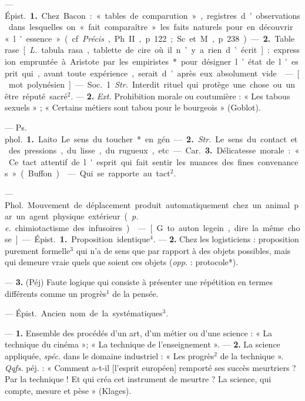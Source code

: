 
	\begin{itemize}[leftmargin=1cm, label=, itemsep=1pt]

 — \si{Épist.} {\bf 1.} Chez Bacon : « tables
de comparution », registres d’observations dans lesquelles on « fait
comparaître » les faits naturels pour
en découvrir « l'essence » (cf. {\it Précis},
Ph. II, p. 122 ; Sc. et M., p. 238). —
 {\bf 2.} Table rase [{\it L.} tabula rasa, tablette de cire où il n’y a rien d’écrit] :
expression empruntée à Aristote
par les empiristes* pour désigner
l’état de l'esprit qui, avant toute
expérience, serait d’après eux absolument vide.

 — [mot polynésien] — \si{Soc.}
1. {\it Str.} Interdit rituel qui protège
une chose ou un être réputé sacré$^2$.
— {\bf 2.} {\it Ext.} Prohibition morale ou coutumière : « Les tabous sexuels » ;
« Certains métiers sont tabou pour
le bourgeois » (Goblot).

 — \si{Ps. phol.} {\bf 1.} Laito. Le sens du
toucher* en gén. — {\bf 2.} {\it Str.} Le sens
du contact et des pressions, du lisse,
du rugueux, etc.

— \si{Car.} {\bf 3.} Délicatesse morale :
« Ce tact attentif de l'esprit qui fait
sentir les nuances des fines convenances » (Buffon).

 — Qui se rapporte au tact$^2$.

 — \si{Phol.} Mouvement de
déplacement produit automatiquement chez un animal par un agent
physique extérieur ({\it p. e.} chimiotactisme des infusoires).

 — [G. to auton legein, dire la
même chose] — \si{Épist.} {\bf 1.} Proposition identique$^4$. — {\bf 2.} Chez les logisticiens : proposition purement formelle$^3$ qui n’a de sens que par rapport
à des objets possibles, mais qui demeure vraie quels que soient ces
objets ({\it opp.} : protocole*).

— {\bf 3.} (Péj) Faute logique qui
consiste à présenter une répétition
en termes différents comme un progrès$^1$ de la pensée.

 — \si{Épist.}
Ancien nom de la systématiques$^3$.

 — {\bf 1.} Ensemble des
procédés d’un art, d’un métier ou
d’une science : « La technique du
cinéma »; « La technique de l'enseignement ». — {\bf 2.} La science appliquée, {\it spéc.} dans le domaine industriel : « Les progrès$^2$ de la technique ». {\it Qqfs.} péj. : « Comment a-t-il
[l'esprit européen] remporté ses
succès meurtriers ? Par la technique !
Et qui créa cet instrument de
meurtre ? La science, qui compte,
mesure et pèse » (Klages).


\end{itemize}
